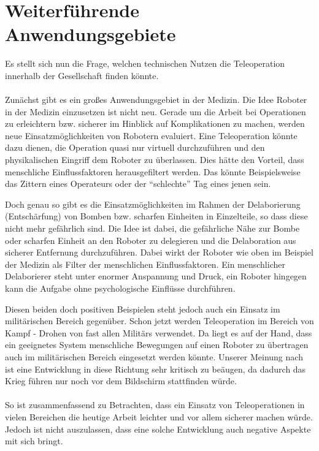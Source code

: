 \section{Weiterführende Anwendungsgebiete}
Es stellt sich nun die Frage, welchen technischen Nutzen die Teleoperation innerhalb der Gesellschaft finden könnte.
\\
\\
\noindent
Zunächst gibt es ein großes Anwendungsgebiet in der Medizin. Die Idee Roboter in der Medizin einzusetzen ist nicht neu. Gerade um die Arbeit bei Operationen zu erleichtern bzw. sicherer im Hinblick auf Komplikationen zu machen, werden neue Einsatzmöglichkeiten von Robotern evaluiert. Eine Teleoperation könnte dazu dienen, die Operation quasi nur virtuell durchzuführen und den physikalischen Eingriff dem Roboter zu überlassen. Dies hätte den Vorteil, dass menschliche Einflussfaktoren herausgefiltert werden. Das könnte Beispielsweise das Zittern eines Operateurs oder der "`schlechte"' Tag eines jenen sein.

Doch genau so gibt es die Einsatzmöglichkeiten im Rahmen der Delaborierung (Entschärfung) von Bomben bzw. scharfen Einheiten in Einzelteile, so dass diese nicht mehr gefährlich sind. Die Idee ist dabei, die gefährliche Nähe zur Bombe oder scharfen Einheit an den Roboter zu delegieren und die Delaboration aus sicherer Entfernung durchzuführen. Dabei wirkt der Roboter wie oben im Beispiel der Medizin als Filter der menschlichen Einflussfaktoren. Ein menschlicher Delaborierer steht unter enormer Anspannung und Druck, ein Roboter hingegen kann die Aufgabe ohne psychologische Einflüsse durchführen. 

Diesen beiden doch positiven Beispielen steht jedoch auch ein Einsatz im militärischen Bereich gegenüber. Schon jetzt werden Teleoperation im Bereich von Kampf - Drohen von fast allen Militärs verwendet. Da liegt es auf der Hand, dass ein geeignetes System menschliche Bewegungen auf einen Roboter zu übertragen auch im militärischen Bereich eingesetzt werden könnte. Unserer Meinung nach ist eine Entwicklung in diese Richtung sehr kritisch zu beäugen, da dadurch das Krieg führen nur noch vor dem Bildschirm stattfinden würde.
\\
\\
\noindent
So ist zusammenfassend zu Betrachten, dass ein Einsatz von Teleoperationen in vielen Bereichen die heutige Arbeit leichter und vor allem sicherer machen würde. Jedoch ist nicht auszulassen, dass eine solche Entwicklung auch negative Aspekte mit sich bringt.

